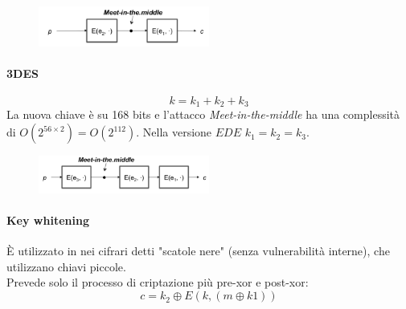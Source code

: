\documentclass[a4paper,12pt]{article}
\begin{document}
\begin{figure}[H]
  \centering
  \includegraphics[width=0.5\textwidth]{img/2des}
\end{figure}

\paragraph{3DES}
$$k = k_1 + k_2 + k_3$$
La nuova chiave è su 168 bits e l'attacco \textit{Meet-in-the-middle} ha una complessità di $O(2^{56\times2}) = O(2^{112})$.
Nella versione $EDE$ $k_1 = k_2 = k_3$.

\begin{figure}[H]
  \centering
  \includegraphics[width=0.5\textwidth]{img/3des}
\end{figure}

\paragraph{Key whitening}
È utilizzato in nei cifrari detti "scatole nere" (senza vulnerabilità interne), che utilizzano chiavi piccole. \\
Prevede solo il processo di criptazione più pre-xor e post-xor:
$$ c = k_2 \oplus E(k, (m \oplus k1)) $$
\end{document}
